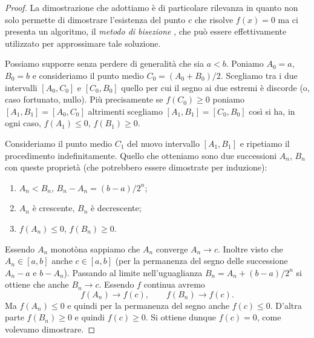 \begin{proof}
\mymark{***}
La dimostrazione che adottiamo è di particolare rilevanza in quanto
non solo permette di dimostrare l'esistenza del punto $c$ che risolve
$f(x)=0$
ma ci presenta
un algoritmo, il \emph{metodo di bisezione}%
%
,
che può essere effettivamente utilizzato per approssimare
tale soluzione.

Possiamo supporre senza perdere di  generalità che sia $a<b$.
Poniamo $A_0 = a$, $B_0= b$ e consideriamo il punto medio $C_0 = (A_0+B_0)/2$.
Scegliamo tra i due intervalli $[A_0, C_0]$ e $[C_0,B_0]$ quello per cui
il segno ai due estremi è discorde (o, caso fortunato, nullo).
Più precisamente se $f(C_0)\ge 0$ poniamo $[A_1,B_1] = [A_0,C_0]$ altrimenti
scegliamo $[A_1,B_1] = [C_0,B_0]$ così si ha, in ogni caso,
$f(A_1)\le 0$, $f(B_1)\ge 0$.

Consideriamo il punto medio $C_1$ del nuovo intervallo $[A_1,B_1]$ e ripetiamo
il procedimento indefinitamente. Quello che otteniamo sono due successioni
$A_n$, $B_n$ con queste proprietà (che potrebbero essere dimostrate per induzione):
\begin{enumerate}
\item $A_n < B_n$, $B_n - A_n = (b-a)/2^n$;
\item $A_n$ è crescente, $B_n$ è decrescente;
\item $f(A_n)\le 0$, $f(B_n)\ge 0$.
\end{enumerate}

Essendo $A_n$ monotòna sappiamo che $A_n$ converge $A_n\to c$.
Inoltre visto che $A_n \in [a,b]$ anche $c\in [a,b]$ (per la permanenza del
segno delle successione $A_n-a$ e $b-A_n$).
Passando al limite nell'uguaglianza $B_n = A_n + (b-a)/2^n$
si ottiene che anche $B_n \to c$. Essendo $f$ continua
avremo
\[
f(A_n) \to f(c), \qquad
f(B_n) \to f(c).
\]
Ma $f(A_n)\le 0$ e quindi per la permanenza del segno anche $f(c)\le 0$.
D'altra parte $f(B_n) \ge 0$ e quindi $f(c)\ge 0$.
Si ottiene dunque $f(c) = 0$, come volevamo dimostrare.
\end{proof}

